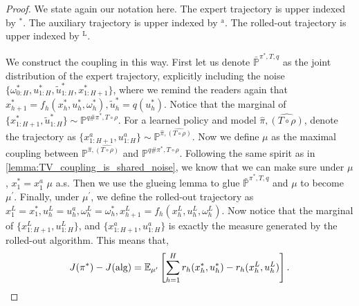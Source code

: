 \documentclass{article}
\begin{document}
\begin{proof} 
    We state again our notation here. The expert trajectory is upper indexed by $^*$. The auxiliary trajectory is upper indexed by $^{\text{a}}$. The rolled-out trajectory is upper indexed by $^\text{L}$.


We construct the coupling in this way. First let us denote $\bar {\mathbb P}^{\pi^*, T, q}$ as the joint distribution of the expert trajectory, explicitly including the noise $\{\omega^*_{0:H},u^*_{1:H},\tilde u_{1:H}^*, x_{1:H+1}^*\}$, where we remind the readers again that $x_{h+1}^*=f_h(x_h^*,u_h^*, \omega_h^*), \tilde u_h^*=q(u_h^*)$. Notice that the marginal of $\{x^*_{1:H+1},\tilde u_{1:H}^*\}\sim \mathbb P^{q\#\pi^*, T\circ \rho}$.  For a learned policy and model $\hat \pi, \widehat{(T\circ \rho)}$, denote the trajectory as $\{x^a_{1:H+1}, u_{1:H}^a\}\sim \mathbb P^{\hat \pi, \widehat{(T\circ \rho)}}$. Now we define $\mu$ as the maximal coupling between $ \mathbb P^{\hat \pi, \widehat{(T\circ \rho)}}$ and $\mathbb P^{q\#\pi^*, T\circ \rho}$. Following the same spirit as in \cref{lemma:TV_coupling_is_shared_noise}, we know that we can make sure under $\mu$, $x_1^*=x_1^a$ $\mu$ a.s. Then we use the glueing lemma to glue $\bar {\mathbb P}^{\pi^*, T, q}$ and $\mu$ to become $\mu^\prime$. Finally, under $\mu^\prime$, we define the rolled-out trajectory as $x_1^L=x_1^*, u_h^L=u_h^a, \omega_h^L = \omega_h^*,x^L_{h+1}=f_h(x_h^L, u_h^L, \omega_h^L) $. Now notice that the marginal of $\{x_{1:H+1}^L,u_{1:H}^L\}$, and $\{x_{1:H+1}^a, u_{1:H}^a\}$ is exactly the measure generated by the rolled-out algorithm. This means that,
\begin{equation*}
    J(\pi^*)-J(\textnormal{alg})=\mathbb E_{\mu^\prime}\left[\sum_{h=1}^H r_h(x_h^*, u_h^*)-r_h(x_h^L,u_h^L)\right].
\end{equation*}


\end{proof}
\end{document}
